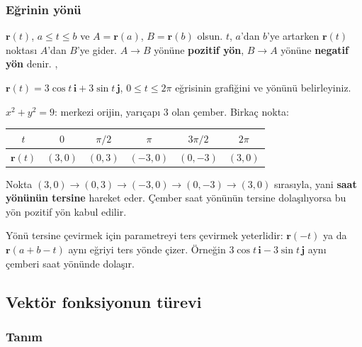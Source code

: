 \subsubsection{Eğrinin yönü}

\begin{tanim}[Yön]
$\mathbf r(t)$, $a\le t\le b$ ve $A=\mathbf r(a)$, $B=\mathbf r(b)$ olsun. $t$, $a$'dan $b$'ye artarken $\mathbf r(t)$ noktası
$A$'dan $B$'ye gider. $A\to B$ yönüne \textbf{pozitif yön}, $B\to A$ yönüne \textbf{negatif yön} denir.
, 
\end{tanim}

\begin{soru}
$\mathbf r(t)=3\cos t\,\mathbf i+3\sin t\,\mathbf j$, $0\le t\le2\pi$ eğrisinin grafiğini ve yönünü belirleyiniz.
\end{soru}
\begin{cevap}
$x^2+y^2=9$: merkezi orijin, yarıçapı $3$ olan çember. Birkaç nokta:
\begin{center}
\begin{tabular}{c c c c c c}
\toprule
$t$ & $0$ & $\pi/2$ & $\pi$ & $3\pi/2$ & $2\pi$\\
\midrule
$\mathbf r(t)$ & $(3,0)$ & $(0,3)$ & $(-3,0)$ & $(0,-3)$ & $(3,0)$\\
\bottomrule
\end{tabular}
\end{center}
Nokta $(3,0)\to(0,3)\to(-3,0)\to(0,-3)\to(3,0)$ sırasıyla, yani \textbf{saat yönünün tersine} hareket eder.
Çember saat yönünün tersine dolaşılıyorsa bu yön pozitif yön kabul edilir.
\end{cevap}

Yönü tersine çevirmek için parametreyi ters çevirmek yeterlidir: $\mathbf r(-t)$ ya da $\mathbf r(a+b-t)$ aynı eğriyi
ters yönde çizer. Örneğin $3\cos t\,\mathbf i-3\sin t\,\mathbf j$ aynı çemberi saat yönünde dolaşır.

\subsection{Vektör fonksiyonun türevi}

\subsubsection{Tanım}

